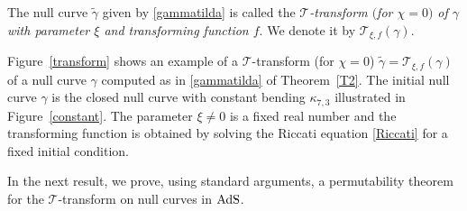 \documentclass[pdftex]{sigma}
\numberwithin{equation}{section}
\def\bending{\kappa}
\def\AdS{{\rm AdS}}
\begin{document}
\begin{Definition} The null curve $\widetilde{\gamma}$ given by \eqref{gammatilda} is called the \emph{$\mathcal{T}$-transform $($for $\chi=0)$ of $\gamma$ with parameter $\xi$ and transforming function $f$}. We denote it by $\mathcal{T}_{\xi,f}(\gamma)$.
\end{Definition}

Figure~\ref{transform} shows an example of a $\mathcal{T}$-transform (for $\chi=0$) $\widetilde{\gamma}=\mathcal{T}_{\xi,f}(\gamma)$ of a null curve $\gamma$ computed as in \eqref{gammatilda} of Theorem~\ref{T2}. The initial null curve $\gamma$ is the closed null curve with constant bending $\bending_{7,3}$ illustrated in Figure~\ref{constant}. The parameter $\xi\neq 0$ is a fixed real number and the transforming function is obtained by solving the Riccati equation \eqref{Riccati} for a fixed initial condition.

In the next result, we prove, using standard arguments, a permutability theorem for the $\mathcal{T}$-transform on null curves in $\AdS$.
\end{document}
